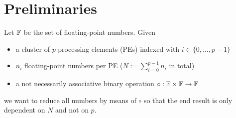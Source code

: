 %
%
%


\section{Preliminaries}
Let $\mathbb{F}$ be the set of floating-point numbers. Given
\begin{itemize}
\item a cluster of $p$ processing elements (PEs) indexed with $i \in \{0, \ldots, p - 1\}$
\item $n_i$ floating-point numbers per PE ($N := \sum_{i=0}^{p-1} n_i$ in total)
\item a not necessarily associative binary operation $\circ: \mathbb{F} \times \mathbb{F} \rightarrow \mathbb{F}$
\end{itemize}
we want to reduce all numbers by means of $\circ$ so that the end result is only dependent
on $N$ and not on $p$.

\label{sec:Preliminaries}